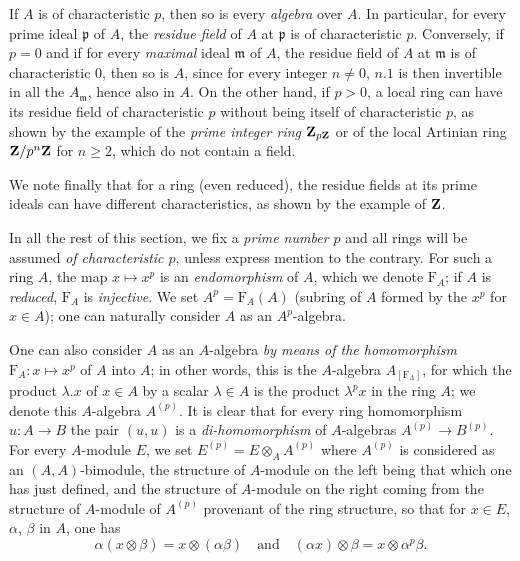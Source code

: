 \begin{env}[21.1.3]
\label{0.21.1.3}
If $A$ is of characteristic $p$, then so is every \emph{algebra} over $A$.
In particular, for every prime ideal $\mathfrak{p}$ of $A$, the \emph{residue field} of $A$ at $\mathfrak{p}$ is of characteristic $p$.
Conversely, if $p=0$ and if for every \emph{maximal} ideal $\mathfrak{m}$ of $A$, the residue field of $A$ at $\mathfrak{m}$ is of characteristic $0$, then so is $A$, since for every integer $n\neq 0$, $n.1$ is then invertible in all the $A_\mathfrak{m}$, hence also in $A$.
On the other hand, if $p>0$, a local ring can have its residue field of characteristic $p$ without being itself of characteristic $p$, as shown by the example of the \emph{prime integer ring} $\mathbf{Z}_{p\mathbf{Z}}$  or of the local Artinian ring $\mathbf{Z}/p^n\mathbf{Z}$ for $n\geq 2$, which do not contain a field.

We note finally that for a ring (even reduced), the residue fields at its prime ideals can have different characteristics, as shown by the example of $\mathbf{Z}$.
\end{env}

\begin{env}[21.1.4]
\label{0.21.1.4}
In all the rest of this section, we fix a \emph{prime number $p$} and all rings will be assumed \emph{of characteristic $p$}, unless express mention to the contrary.
For such a ring $A$, the map $x\mapsto x^p$ is an \emph{endomorphism} of $A$, which we denote $\mathrm{F}_A$; if $A$ is \emph{reduced}, $\mathrm{F}_A$ is \emph{injective}.
We set $A^p=\mathrm{F}_A(A)$ (subring of $A$ formed by the $x^p$ for $x\in A$); one can naturally consider $A$ as an $A^p$-algebra.

One can also consider $A$ as an $A$-algebra \emph{by means of the homomorphism} $\mathrm{F}_A:x\mapsto x^p$ of $A$ into $A$; in other words, this is the $A$-algebra $A_{[\mathrm{F}_A]}$, for which the product $\lambda.x$ of $x\in A$ by a scalar $\lambda\in A$ is the product $\lambda^p x$ in the ring $A$; we denote this $A$-algebra $A^{(p)}$.
It is clear that for every ring homomorphism $u:A\to B$ the pair $(u,u)$ is a \emph{di-homomorphism} of $A$-algebras $A^{(p)}\to B^{(p)}$.
For every $A$-module $E$, we set $E^{(p)}=E\otimes_A A^{(p)}$ where $A^{(p)}$ is considered as an $(A,A)$-bimodule, the structure of $A$-module on the left being that which one has just defined, and the structure of $A$-module on the right coming from the structure of $A$-module of $A^{(p)}$ provenant of the ring structure, so that for $x\in E$, $\alpha$, $\beta$ in $A$, one has
\[
  \alpha(x\otimes\beta)=x\otimes(\alpha\beta) \quad\text{and}\quad (\alpha x)\otimes\beta=x\otimes\alpha^p\beta.
\]
\end{env}

